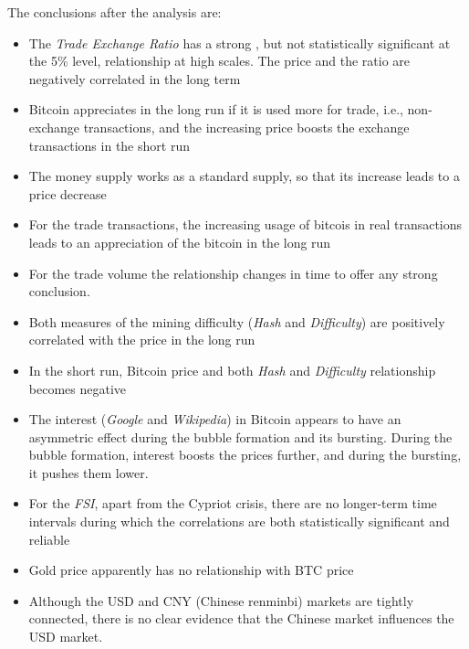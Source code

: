 The conclusions after the analysis are:
\begin{itemize}
\item The \textit{Trade Exchange Ratio} has a strong , but not
  statistically significant at the 5\% level, relationship at high
  scales. The price and the ratio are negatively correlated in the
  long term
\item Bitcoin appreciates in the long run if it is used more for
  trade, i.e., non-exchange transactions, and the increasing price
  boosts the exchange transactions in the short run
\item The money supply works as a standard supply, so that its
  increase leads to a price decrease
\item For the trade transactions, the increasing usage of bitcois in
  real transactions leads to an appreciation of the bitcoin in the
  long run
\item For the trade volume the relationship changes in time to offer
  any strong conclusion.
\item Both measures of the mining difficulty (\textit{Hash} and
  \textit{Difficulty}) are positively correlated with the price in the
  long run
\item In the short run, Bitcoin price and both \textit{Hash} and
  \textit{Difficulty} relationship becomes negative
\item The interest (\textit{Google} and \textit{Wikipedia}) in Bitcoin
  appears to have an asymmetric effect during the bubble formation and
  its bursting. During the bubble formation, interest boosts the
  prices further, and during the bursting, it pushes them lower.
\item For the \textit{FSI}, apart from the Cypriot crisis, there are
  no longer-term time intervals during which the correlations are both
  statistically significant and reliable
\item Gold price apparently has no relationship with BTC price
\item Although the USD and CNY (Chinese renminbi) markets are tightly
  connected, there is no clear evidence that the Chinese market
  influences the USD market.
\end{itemize}

